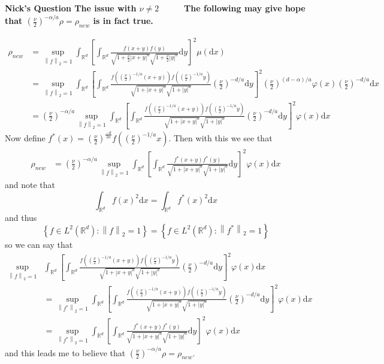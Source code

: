 \documentclass[a4paper,11pt]{article}
\numberwithin{equation}{section}
\theoremstyle{plain}
\theoremstyle{definition}
\newcommand{\ud}{\ensuremath{\mathrm{d} }}
\newcommand{\Norm}[1]{\left\|  #1   \right\|}
\newcommand{\R}{\mathbb{R}}
\newcounter{NQ}
\newenvironment{NickQuestion}[1][] %
{\refstepcounter{NQ}
	\begin{mdframed}[backgroundcolor=lightgray]\textbf{Nick's Question \theNQ \: #1~~}~~~\noindent}%
	{\end{mdframed}}
\numberwithin{NQ}{section}
\numberwithin{LQ}{section}
\numberwithin{ZQ}{section}
\begin{document}
\begin{NickQuestion}[The issue with $\nu \not = 2$]
		\noindent\textbf{The following may give hope that $\left( \frac{\nu}{2} \right)^{-\alpha/a} \rho  = \rho_{new}$ is in fact true.}

		\begin{align*}
		\rho_{new} &= \sup_{\Norm{f}_2 =1} \int_{\R^d} \left[ \int_{\R^d} \frac{f(x+y)f(y)}{\sqrt{1+\frac{\nu}{2}|x+y|^a } \sqrt{1+\frac{\nu}{2}|y|^a} } \ud y \right]^2 \mu(\ud x)
		\\& = \sup_{\Norm{f}_2 =1} \int_{\R^d} \left[ \int_{\R^d} \frac{f\left(\left(\frac{\nu}{2}\right)^{-1/a}(x+y)\right)f\left(\left(\frac{\nu}{2}\right)^{-1/a}y\right)}{\sqrt{1+|x+y|^a } \sqrt{1+|y|^a} } \left(\frac{\nu}{2}\right)^{-d/a} \ud y \right]^2 \left(\frac{\nu}{2}\right)^{(d-\alpha)/a}\varphi(x)\left(\frac{\nu}{2}\right)^{-d/a}\ud x
		\\&= \left( \frac{\nu}{2} \right)^{-\alpha/a} \sup_{\Norm{f}_2 =1} \int_{\R^d} \left[ \int_{\R^d} \frac{f\left(\left(\frac{\nu}{2}\right)^{-1/a}(x+y)\right)f\left(\left(\frac{\nu}{2}\right)^{-1/a}y\right)}{\sqrt{1+|x+y|^a } \sqrt{1+|y|^a} } \left(\frac{\nu}{2}\right)^{-d/a} \ud y \right]^2 \varphi(x)\ud x
		\end{align*}
		Now define $f^*(x) =\left(\frac{\nu}{2}\right)^{\frac{-d}{2a}} f\left( \left(\frac{\nu}{2}\right)^{-1/a} x \right)$. Then with this we see that
		\begin{align*}
		\rho_{new} &= \left( \frac{\nu}{2} \right)^{-\alpha/a} \sup_{\Norm{f}_2 =1} \int_{\R^d} \left[ \int_{\R^d} \frac{f^*\left(x+y\right)f^*\left(y\right)}{\sqrt{1+|x+y|^a } \sqrt{1+|y|^a} }  \ud y \right]^2 \varphi(x)\ud x
		\end{align*}
		and note that
		\[
		\int_{\R^d} f(x)^2 \ud x = \int_{\R^d} f^*(x)^2 \ud x
		\]
		and thus
		\[
		\left\{ f \in L^2(\R^d) : \Norm{f}_2 = 1 \right\} = 	\left\{ f \in L^2(\R^d) : \Norm{f^*}_2 = 1 \right\}
		\]
		so we can say that
		\begin{align*}
		\sup_{\Norm{f}_2 =1} & \int_{\R^d} \left[ \int_{\R^d} \frac{f\left(\left(\frac{\nu}{2}\right)^{-1/a}(x+y)\right)f\left(\left(\frac{\nu}{2}\right)^{-1/a}y\right)}{\sqrt{1+|x+y|^a } \sqrt{1+|y|^a} } \left(\frac{\nu}{2}\right)^{-d/a}  \ud y \right]^2 \varphi(x)\ud x
		\\&  =  \sup_{\Norm{f^*}_2 =1} \int_{\R^d} \left[ \int_{\R^d} \frac{f\left(\left(\frac{\nu}{2}\right)^{-1/a}(x+y)\right)f\left(\left(\frac{\nu}{2}\right)^{-1/a}y\right)}{\sqrt{1+|x+y|^a } \sqrt{1+|y|^a} } \left(\frac{\nu}{2}\right)^{-d/a}  \ud y \right]^2 \varphi(x)\ud x
		\\&=  \sup_{\Norm{f^*}_2 =1}  \int_{\R^d} \left[ \int_{\R^d} \frac{f^*\left(x+y\right)f^*\left(y\right)}{\sqrt{1+|x+y|^a } \sqrt{1+|y|^a} }  \ud y \right]^2 \varphi(x)\ud x
		\end{align*}
		and this leads me to believe that $\left( \frac{\nu}{2} \right)^{-\alpha/a} \rho  = \rho_{new}$.


\end{NickQuestion}
\end{document}
